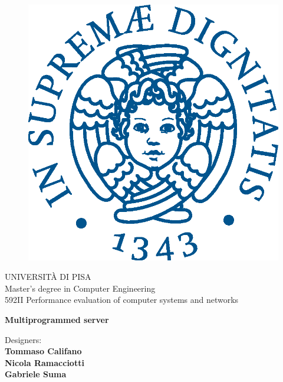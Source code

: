 \begin{titlepage}
\begin{figure}[!htb]
    \centering
    \includegraphics[keepaspectratio=true,scale=0.5]{ImgFrontespizio/cherubinFrontespizio.eps}
\end{figure}

\begin{center}
    \LARGE{UNIVERSITÀ DI PISA}
    \vspace{5mm}
    \\ \large{Master's degree in Computer Engineering}
    \vspace{5mm}
    \\ \LARGE{592II Performance evaluation of computer systems and networks}
\end{center}

\vspace{15mm}
\begin{center}
    {\LARGE{\bf Multiprogrammed server}}
    
\end{center}
\vspace{30mm}


\hfill
\begin{minipage}[t]{0.47\textwidth}\raggedleft
	{\large{Designers:}{\normalsize\vspace{3mm} \bf\\ \large{Tommaso Califano}}
 {\normalsize\vspace{3mm} \bf\\ \large{Nicola Ramacciotti}}
 {\normalsize\vspace{3mm} \bf\\ \large{Gabriele Suma}}}
 
\end{minipage}

\vspace{30mm}
\hrulefill
\\

\end{titlepage}
